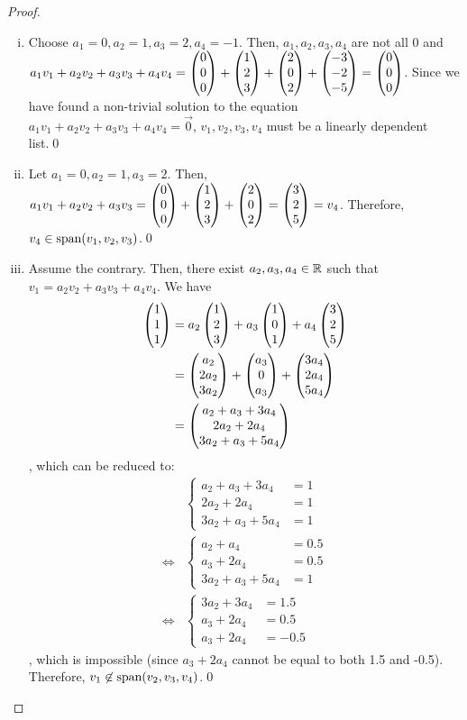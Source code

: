\begin{proof}
    \renewcommand{\qedsymbol}{$ $}
    \begin{enumerate}[(i)]
        \renewcommand{\qedsymbol}{$\blacksquare$}
        \item Choose $a_1=0, a_2=1, a_3=2, a_4=-1$. Then, $a_1,a_2,a_3,a_4$ are not all 0 and $a_1v_1+a_2v_2+a_3v_3+a_4v_4=\begin{pmatrix} 0\\ 0\\ 0\end{pmatrix}+\begin{pmatrix} 1\\ 2\\ 3\end{pmatrix}+\begin{pmatrix} 2\\ 0\\ 2\end{pmatrix}+\begin{pmatrix} -3\\ -2\\ -5\end{pmatrix}=\begin{pmatrix} 0\\ 0\\ 0\end{pmatrix}$. Since we have found a non-trivial solution to the equation $a_1v_1+a_2v_2+a_3v_3+a_4v_4=\vec{0}$, $v_1,v_2,v_3,v_4$ must be a linearly dependent list.\qed
        \item Let $a_1=0, a_2=1, a_3=2$. Then, $a_1v_1+a_2v_2+a_3v_3=\begin{pmatrix} 0\\ 0\\ 0\end{pmatrix}+\begin{pmatrix} 1\\ 2\\ 3\end{pmatrix}+\begin{pmatrix} 2\\ 0\\ 2\end{pmatrix}=\begin{pmatrix} 3\\ 2\\ 5\end{pmatrix}=v_4$. Therefore, $v_4\in\textnormal{span}(v_1,v_2,v_3)$.\qed
        \item Assume the contrary. Then, there exist $a_2,a_3,a_4\in\mathbb R$ such that $v_1=a_2v_2+a_3v_3+a_4v_4$. We have
              \[
                  \begin{aligned}
                      \begin{pmatrix} 1\\ 1\\ 1\end{pmatrix} & = a_2 \begin{pmatrix} 1\\ 2\\ 3\end{pmatrix}+a_3 \begin{pmatrix} 1\\ 0\\ 1\end{pmatrix}+a_4 \begin{pmatrix} 3\\ 2\\ 5\end{pmatrix}          \\
                                            & = \begin{pmatrix} a_2\\ 2a_2\\ 3a_2\end{pmatrix}+\begin{pmatrix} a_3\\ 0\\ a_3\end{pmatrix}+\begin{pmatrix} 3a_4\\ 2a_4\\ 5a_4\end{pmatrix} \\
                                            & = \begin{pmatrix} a_2+a_3+3a_4\\ 2a_2+2a_4\\ 3a_2+a_3+5a_4\end{pmatrix}
                  \end{aligned}
              \]
              , which can be reduced to:
              \begin{align*}
                   & \begin{cases}
                         a_2+a_3+3a_4  & = 1 \\
                         2a_2+2a_4     & = 1 \\
                         3a_2+a_3+5a_4 & = 1
                     \end{cases}   \\
                  \iff
                   & \begin{cases}
                         a_2+a_4       & = 0.5 \\
                         a_3+2a_4      & = 0.5 \\
                         3a_2+a_3+5a_4 & = 1
                     \end{cases} \\
                  \iff
                   & \begin{cases}
                         3a_2+3a_4 & = 1.5  \\
                         a_3+2a_4  & = 0.5  \\
                         a_3+2a_4  & = -0.5
                     \end{cases}
              \end{align*}
              , which is impossible (since $a_3+2a_4$ cannot be equal to both 1.5 and -0.5). Therefore, $v_1\not\in\textnormal{span}{(v_2,v_3,v_4)}$.\qed
    \end{enumerate}
\end{proof}